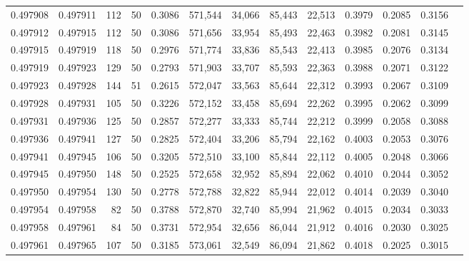 \begin{tabular}{rrrrrrrrrrrrr}
0.497908 & 0.497911 &   112 &  50 &                                     0.3086 & 571,544 &  34,066 &  85,443 &  22,513 & 0.3979 & 0.2085 & 0.3156 \\
0.497912 & 0.497915 &   112 &  50 &                                     0.3086 & 571,656 &  33,954 &  85,493 &  22,463 & 0.3982 & 0.2081 & 0.3145 \\
0.497915 & 0.497919 &   118 &  50 &                                     0.2976 & 571,774 &  33,836 &  85,543 &  22,413 & 0.3985 & 0.2076 & 0.3134 \\
0.497919 & 0.497923 &   129 &  50 &                                     0.2793 & 571,903 &  33,707 &  85,593 &  22,363 & 0.3988 & 0.2071 & 0.3122 \\
0.497923 & 0.497928 &   144 &  51 &                                     0.2615 & 572,047 &  33,563 &  85,644 &  22,312 & 0.3993 & 0.2067 & 0.3109 \\
0.497928 & 0.497931 &   105 &  50 &                                     0.3226 & 572,152 &  33,458 &  85,694 &  22,262 & 0.3995 & 0.2062 & 0.3099 \\
0.497931 & 0.497936 &   125 &  50 &                                     0.2857 & 572,277 &  33,333 &  85,744 &  22,212 & 0.3999 & 0.2058 & 0.3088 \\
0.497936 & 0.497941 &   127 &  50 &                                     0.2825 & 572,404 &  33,206 &  85,794 &  22,162 & 0.4003 & 0.2053 & 0.3076 \\
0.497941 & 0.497945 &   106 &  50 &                                     0.3205 & 572,510 &  33,100 &  85,844 &  22,112 & 0.4005 & 0.2048 & 0.3066 \\
0.497945 & 0.497950 &   148 &  50 &                                     0.2525 & 572,658 &  32,952 &  85,894 &  22,062 & 0.4010 & 0.2044 & 0.3052 \\
0.497950 & 0.497954 &   130 &  50 &                                     0.2778 & 572,788 &  32,822 &  85,944 &  22,012 & 0.4014 & 0.2039 & 0.3040 \\
0.497954 & 0.497958 &    82 &  50 &                                     0.3788 & 572,870 &  32,740 &  85,994 &  21,962 & 0.4015 & 0.2034 & 0.3033 \\
0.497958 & 0.497961 &    84 &  50 &                                     0.3731 & 572,954 &  32,656 &  86,044 &  21,912 & 0.4016 & 0.2030 & 0.3025 \\
0.497961 & 0.497965 &   107 &  50 &                                     0.3185 & 573,061 &  32,549 &  86,094 &  21,862 & 0.4018 & 0.2025 & 0.3015 \\

\end{tabular}
